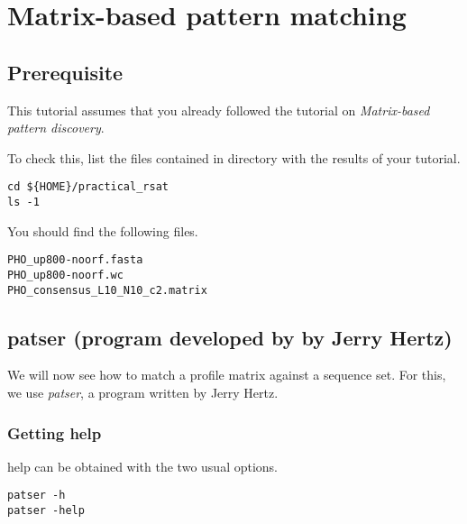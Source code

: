 
\chapter{Matrix-based pattern matching}

\section{Prerequisite}

This tutorial assumes that you already followed the tutorial on
\textit{Matrix-based pattern discovery}. 

To check this, list the files contained in directory with the results
of your tutorial.

{\color{Blue} \begin{footnotesize} 
\begin{verbatim}
cd ${HOME}/practical_rsat
ls -1
\end{verbatim} \end{footnotesize}
}

You should find the following files.

{\color{OliveGreen} \begin{footnotesize} 
\begin{verbatim}
PHO_up800-noorf.fasta
PHO_up800-noorf.wc
PHO_consensus_L10_N10_c2.matrix
\end{verbatim} \end{footnotesize}
}

\section{patser (program developed by by Jerry Hertz)}

We will now see how to match a profile matrix against a sequence
set. For this, we use \textit{patser}, a program written by Jerry
Hertz. 

\subsection{Getting help}

help can be obtained with the two usual options.

{\color{Blue} \begin{footnotesize} 
\begin{verbatim}
patser -h
patser -help
\end{verbatim} \end{footnotesize}
}

